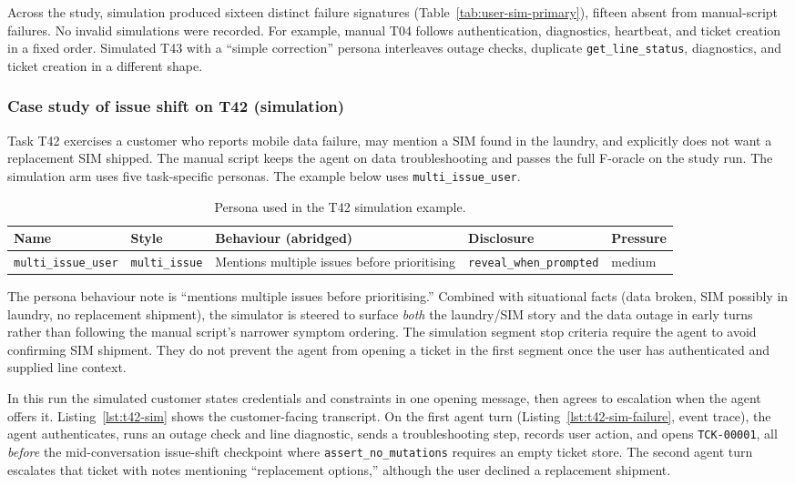 Across the study, simulation produced sixteen distinct failure signatures (Table~\ref{tab:user-sim-primary}), fifteen absent from manual-script failures. No invalid simulations were recorded. For example, manual T04 follows authentication, diagnostics, heartbeat, and ticket creation in a fixed order. Simulated T43 with a ``simple correction'' persona interleaves outage checks, duplicate \texttt{get\_line\_status}, diagnostics, and ticket creation in a different shape.

\subsubsection{Case study of issue shift on T42 (simulation)}

Task T42 exercises a customer who reports mobile data failure, may mention a SIM found in the laundry, and explicitly does not want a replacement SIM shipped. The manual script keeps the agent on data troubleshooting and passes the full F-oracle on the study run. The simulation arm uses five task-specific personas. The example below uses \texttt{multi\_issue\_user}.

\begin{table}[htbp]
\centering
\caption{Persona used in the T42 simulation example.}
\label{tab:t42-persona}
\small
\begin{tabular}{@{}llp{3.2cm}ll@{}}
\toprule
Name & Style & Behaviour (abridged) & Disclosure & Pressure \\
\midrule
\texttt{multi\_issue\_user} & \texttt{multi\_issue} & Mentions multiple issues before prioritising & \texttt{reveal\_when\_prompted} & medium \\
\bottomrule
\end{tabular}
\end{table}

The persona behaviour note is ``mentions multiple issues before prioritising.'' Combined with situational facts (data broken, SIM possibly in laundry, no replacement shipment), the simulator is steered to surface \emph{both} the laundry/SIM story and the data outage in early turns rather than following the manual script's narrower symptom ordering. The simulation segment stop criteria require the agent to avoid confirming SIM shipment. They do not prevent the agent from opening a ticket in the first segment once the user has authenticated and supplied line context.

In this run the simulated customer states credentials and constraints in one opening message, then agrees to escalation when the agent offers it. Listing~\ref{lst:t42-sim} shows the customer-facing transcript. On the first agent turn (Listing~\ref{lst:t42-sim-failure}, event trace), the agent authenticates, runs an outage check and line diagnostic, sends a troubleshooting step, records user action, and opens \texttt{TCK-00001}, all \emph{before} the mid-conversation issue-shift checkpoint where \texttt{assert\_no\_mutations} requires an empty ticket store. The second agent turn escalates that ticket with notes mentioning ``replacement options,'' although the user declined a replacement shipment.

